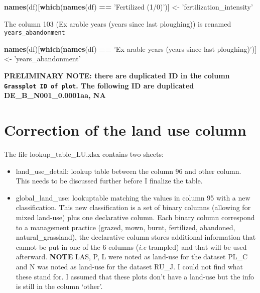 \documentclass[table]{article}
\newenvironment{Shaded}{\begin{snugshade}}{\end{snugshade}}
\newcommand{\KeywordTok}[1]{\textcolor[rgb]{0.13,0.29,0.53}{\textbf{#1}}}
\newcommand{\StringTok}[1]{\textcolor[rgb]{0.31,0.60,0.02}{#1}}
\newcommand{\OperatorTok}[1]{\textcolor[rgb]{0.81,0.36,0.00}{\textbf{#1}}}
\newcommand{\NormalTok}[1]{#1}
\providecommand{\tightlist}{%
  \setlength{\itemsep}{0pt}\setlength{\parskip}{0pt}}
\begin{document}
\begin{Shaded}
\begin{Highlighting}[]
\KeywordTok{names}\NormalTok{(df)[}\KeywordTok{which}\NormalTok{(}\KeywordTok{names}\NormalTok{(df) }\OperatorTok{==}\StringTok{ 'Fertilized (1/0)'}\NormalTok{)] <-}\StringTok{ 'fertilization_intensity'}
\end{Highlighting}
\end{Shaded}

The column 103 (Ex arable years (years since last ploughing)) is renamed
\texttt{years\_abandonment}

\begin{Shaded}
\begin{Highlighting}[]
\KeywordTok{names}\NormalTok{(df)[}\KeywordTok{which}\NormalTok{(}\KeywordTok{names}\NormalTok{(df) }\OperatorTok{==}\StringTok{ 'Ex arable years (years since last ploughing)'}\NormalTok{)] <-}\StringTok{ 'years_abandonment'}
\end{Highlighting}
\end{Shaded}

\textbf{PRELIMINARY NOTE: there are duplicated ID in the column
\texttt{Grassplot\ ID\ of\ plot}. The following ID are duplicated
DE\_B\_N001\_0.0001aa, NA}

\section{Correction of the land use
column}\label{correction-of-the-land-use-column}

The file lookup\_table\_LU.xlsx contains two sheets:

\begin{itemize}
\tightlist
\item
  land\_use\_detail: lookup table between the column 96 and other
  column. This needs to be discussed further before I finalize the
  table.
\item
  global\_land\_use: lookuptable matching the values in column 95 with a
  new classification. This new classification is a set of binary columns
  (allowing for mixed land-use) plus one declarative column. Each binary
  column correspond to a management practice (grazed, mown, burnt,
  fertilized, abandoned, natural\_grassland), the declarative column
  stores additional information that cannot be put in one of the 6
  columns (\emph{i.e} trampled) and that will be used afterward.
  \textbf{NOTE} LAS, P, L were noted as land-use for the dataset PL\_C
  and N was noted as land-use for the dataset RU\_J. I could not find
  what these stand for. I assumed that these plots don't have a land-use
  but the info is still in the column `other'.
\end{itemize}
\end{document}
